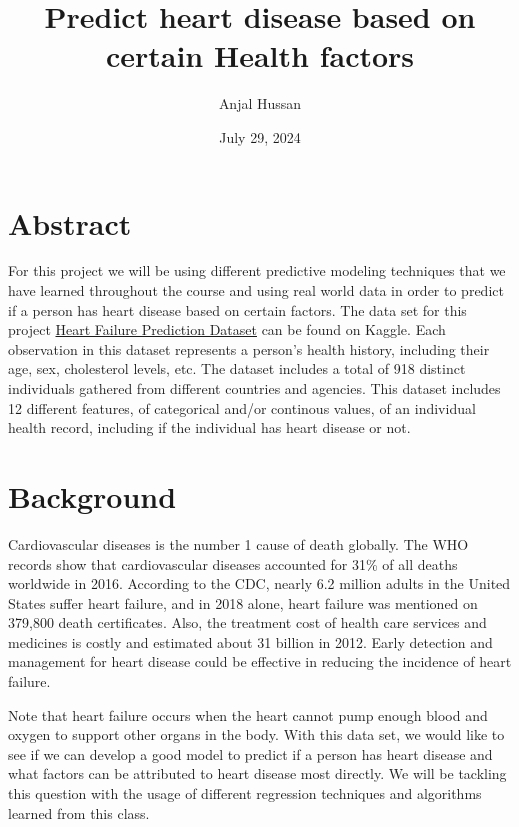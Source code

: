 \documentclass[
]{article}
\title{Predict heart disease based on certain Health factors}
\author{Anjal Hussan}
\date{July 29, 2024}
\begin{document}
\maketitle

{
\setcounter{tocdepth}{4}
\tableofcontents
}
\newpage

\section{Abstract}\label{abstract}

For this project we will be using different predictive modeling
techniques that we have learned throughout the course and using real
world data in order to predict if a person has heart disease based on
certain factors. The data set for this project
\href{https://www.kaggle.com/fedesoriano/heart-failure-prediction}{Heart
Failure Prediction Dataset} can be found on Kaggle. Each observation in
this dataset represents a person's health history, including their age,
sex, cholesterol levels, etc. The dataset includes a total of 918
distinct individuals gathered from different countries and agencies.
This dataset includes 12 different features, of categorical and/or
continous values, of an individual health record, including if the
individual has heart disease or not.

\section{Background}\label{background}

Cardiovascular diseases is the number 1 cause of death globally. The WHO
records show that cardiovascular diseases accounted for 31\% of all
deaths worldwide in 2016. According to the CDC, nearly 6.2 million
adults in the United States suffer heart failure, and in 2018 alone,
heart failure was mentioned on 379,800 death certificates. Also, the
treatment cost of health care services and medicines is costly and
estimated about 31 billion in 2012. Early detection and management for
heart disease could be effective in reducing the incidence of heart
failure.

Note that heart failure occurs when the heart cannot pump enough blood
and oxygen to support other organs in the body. With this data set, we
would like to see if we can develop a good model to predict if a person
has heart disease and what factors can be attributed to heart disease
most directly. We will be tackling this question with the usage of
different regression techniques and algorithms learned from this class.
\end{document}
